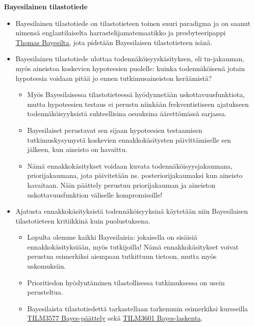 \documentclass[
]{book}
\providecommand{\tightlist}{%
  \setlength{\itemsep}{0pt}\setlength{\parskip}{0pt}}
\begin{document}
\hfill\break

\textbf{Bayesilainen tilastotiede}

\begin{itemize}
\tightlist
\item
  Bayesilainen tilastotiede on tilastotieteen toinen suuri paradigma ja on saanut nimensä englantilaiselta harrastelijamatemaatikko ja presbyteeripappi \href{https://fi.wikipedia.org/wiki/Bayesil\%C3\%A4inen_tilastotiede}{Thomas Bayesilta}, jota pidetään Bayesilaisen tilastotieteen isänä.
\item
  Bayesilainen tilastotiede ulottaa todennäköisyyskäsityksen, eli tn-jakauman, myös aineistoa koskevien hypoteesien puolelle: kuinka todennäköisenä jotain hypoteesia voidaan pitää jo ennen tutkimusaineiston keräämistä?

  \begin{itemize}
  \tightlist
  \item
    Myös Bayesilaisessa tilastotieteessä hyödynnetään uskottavuusfunktiota, mutta hypoteesien testaus ei perustu niinkään frekventistiseen ajatukseen todennäköisyyksistä suhteellisina osuuksina äärettömässä sarjassa.
  \item
    Bayesilaiset perustavat sen sijaan hypoteesien testaamisen tutkimuskysymystä koskevien ennakkokäsitysten päivittämiselle sen jälkeen, kun aineisto on havaittu.
  \item
    Nämä ennakkokäsitykset voidaan kuvata todennäköisyysjakaumana, priorijakaumana, jota päivitetään ns. posteriorijakaumaksi kun aineisto havaitaan. Näin päättely perustuu priorijakauman ja aineiston uskottavuusfunktion väliselle kompromissille!
  \end{itemize}
\item
  Ajatusta ennakkokäsityksistä todennäköisyyksinä käytetään niin Bayesilaisen tilastotieteen kritiikkinä kuin puolustuksena.

  \begin{itemize}
  \tightlist
  \item
    Lopulta olemme kaikki Bayesilaisia: jokaisella on sisäisiä ennakkokäsityksiään, myös tutkijoilla! Nämä ennakkokäsitykset voivat perustua esimerkiksi aiempaan tutkittuun tietoon, mutta myös uskomuksiin.
  \item
    Prioritiedon hyödyntäminen tilastollisessa tutkimuksessa on usein perusteltua.
  \item
    Bayesilaista tilastotiedettä tarkastellaan tarkemmin esimerkiksi kursseilla \href{https://opas.peppi.utu.fi/fi/opintojakso/TILM3577/6969}{TILM3577 Bayes-päättely} sekä \href{https://opas.peppi.utu.fi/fi/opintojakso/TILM3601/21033}{TILM3601 Bayes-laskenta}.
  \end{itemize}
\end{itemize}
\end{document}
